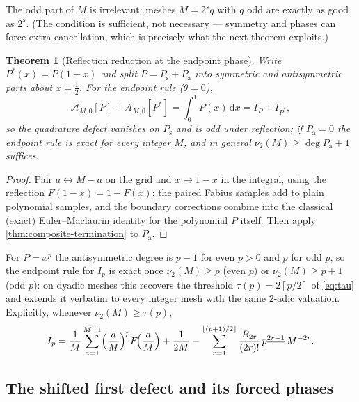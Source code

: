 \documentclass[11pt,oneside]{article}
\numberwithin{equation}{section}
\newtheorem{theorem}{Theorem}[section]
\theoremstyle{definition}
\theoremstyle{remark}
\newcommand{\dd}{\,\mathrm d}
\newcommand{\vtwo}{\nu_2}
\newcommand{\fall}[2]{#1^{\underline{#2}}}
\newcommand{\floor}[1]{\left\lfloor #1\right\rfloor}
\newcommand{\ceil}[1]{\left\lceil #1\right\rceil}
\begin{document}
The odd part of $M$ is irrelevant: meshes $M=2^{s}q$ with $q$ odd are
exactly as good as $2^{s}$.  (The condition is sufficient, not
necessary --- symmetry and phases can force extra cancellation, which
is precisely what the next theorem exploits.)

\begin{theorem}[Reflection reduction at the endpoint phase]
\label{thm:reflection-reduction}
Write $P^*(x)=P(1-x)$ and split
$P=P_{\mathrm s}+P_{\mathrm a}$ into symmetric and antisymmetric parts
about $x=\tfrac12$.  For the endpoint rule ($\theta=0$),
\begin{equation}
 \mathcal A_{M,0}[P]+\mathcal A_{M,0}[P^*]=\int_0^1P(x)\dd x
 =I_P+I_{P^*},
 \label{eq:reflection-pair}
\end{equation}
so the quadrature defect vanishes on $P_{\mathrm s}$ and is odd under
reflection; if $P_{\mathrm a}=0$ the endpoint rule is exact for every
integer $M$, and in general
$\vtwo(M)\ge\deg P_{\mathrm a}+1$ suffices.
\end{theorem}

\begin{proof}
Pair $a\leftrightarrow M-a$ on the grid and $x\mapsto1-x$ in the
integral, using the reflection $F(1-x)=1-F(x)$: the paired Fabius
samples add to plain polynomial samples, and the boundary corrections
combine into the classical (exact) Euler--Maclaurin identity for the
polynomial $P$ itself.  Then apply \cref{thm:composite-termination}
to $P_{\mathrm a}$.
\end{proof}

For $P=x^{p}$ the antisymmetric degree is $p-1$ for even $p>0$ and $p$
for odd $p$, so the endpoint rule for $I_p$ is exact once
$\vtwo(M)\ge p$ (even $p$) or $\vtwo(M)\ge p+1$ (odd $p$): on dyadic
meshes this recovers the threshold $\tau(p)=2\ceil{p/2}$ of
\eqref{eq:tau} and extends it verbatim to every integer mesh with the
same $2$-adic valuation.  Explicitly, whenever
$\vtwo(M)\ge\tau(p)$,
\begin{equation}
 I_p=\frac1M\sum_{a=1}^{M-1}\Bigl(\frac aM\Bigr)^{p}
 F\!\Bigl(\frac aM\Bigr)
 +\frac1{2M}
 -\sum_{r=1}^{\floor{(p+1)/2}}
 \frac{B_{2r}}{(2r)!}\,\fall p{2r-1}\,M^{-2r}.
 \label{eq:Ip-composite}
\end{equation}

\subsection{The shifted first defect and its forced phases}
\end{document}
